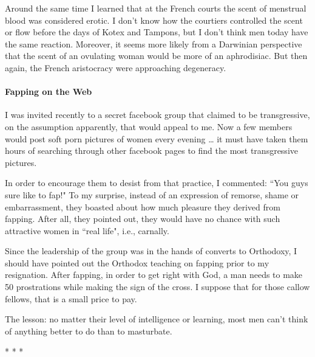 Around the same time I learned that at the French courts the scent of menstrual blood was considered erotic. I don't know how the courtiers controlled the scent or flow before the days of Kotex and Tampons, but I don't think men today have the same reaction. Moreover, it seems more likely from a Darwinian perspective that the scent of an ovulating woman would be more of an aphrodisiac. But then again, the French aristocracy were approaching degeneracy.

\paragraph{Fapping on the Web}
I was invited recently to a secret facebook group that claimed to be transgressive, on the assumption apparently, that would appeal to me. Now a few members would post soft porn pictures of women every evening … it must have taken them hours of searching through other facebook pages to find the most transgressive pictures.

In order to encourage them to desist from that practice, I commented: ``You guys sure like to fap!" To my surprise, instead of an expression of remorse, shame or embarrassment, they boasted about how much pleasure they derived from fapping. After all, they pointed out, they would have no chance with such attractive women in ``real life", i.e., carnally.

Since the leadership of the group was in the hands of converts to Orthodoxy, I should have pointed out the Orthodox teaching on fapping prior to my resignation. After fapping, in order to get right with God, a man needs to make 50 prostrations while making the sign of the cross. I suppose that for those callow fellows, that is a small price to pay.

The lesson: no matter their level of intelligence or learning, most men can't think of anything better to do than to masturbate.




\begin{center}* * *\end{center}

